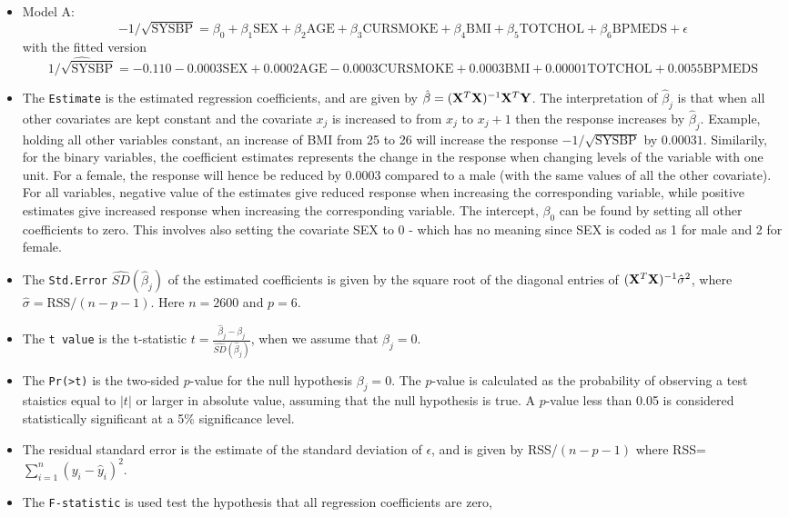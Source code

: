 \documentclass[]{article}
\begin{document}
\begin{itemize}
\item
  {Model A:
  \[-1/\sqrt{\text{SYSBP}}=\beta_0 + \beta_1 \text{SEX} + \beta_2 \text{AGE} + \beta_3 \text{CURSMOKE} + \beta_4 \text{BMI} + \beta_5 \text{TOTCHOL} + \beta_6 \text{BPMEDS} + \epsilon\]
  with the fitted version
  \[\widehat{1/\sqrt{\text{SYSBP}}}=-0.110 -0.0003 \text{SEX} +0.0002 \text{AGE} -0.0003 \text{CURSMOKE} + 0.0003 \text{BMI} + 0.00001 \text{TOTCHOL} + 0.0055 \text{BPMEDS}\]}
\item
  {The \texttt{Estimate} is the estimated regression coefficients, and
  are given by \(\hat{\beta}=({\bf X}^T{\bf X})^{-1}{\bf X}^T{\bf Y}\).
  The interpretation of \(\hat{\beta}_j\) is that when all other
  covariates are kept constant and the covariate \(x_j\) is increased to
  from \(x_j\) to \(x_j+1\) then the response increases by
  \(\hat{\beta}_j\). Example, holding all other variables constant, an
  increase of BMI from 25 to 26 will increase the response
  \(-1/\sqrt{\text{SYSBP}}\) by \(0.00031\). Similarily, for the binary
  variables, the coefficient estimates represents the change in the
  response when changing levels of the variable with one unit. For a
  female, the response will hence be reduced by \(0.0003\) compared to a
  male (with the same values of all the other covariate). For all
  variables, negative value of the estimates give reduced response when
  increasing the corresponding variable, while positive estimates give
  increased response when increasing the corresponding variable. The
  intercept, \(\beta_0\) can be found by setting all other coefficients
  to zero. This involves also setting the covariate SEX to 0 - which has
  no meaning since SEX is coded as 1 for male and 2 for female. }
\item
  {The \texttt{Std.Error} \(\hat{SD}(\hat\beta_j)\) of the estimated
  coefficients is given by the square root of the diagonal entries of
  \(({\bf X}^T{\bf X})^{-1}\hat{\sigma}^2\), where
  \(\hat{\sigma}=\text{RSS}/(n-p-1)\). Here \(n=2600\) and \(p=6\).}
\item
  {The \texttt{t\ value} is the t-statistic
  \(t = \frac{\hat\beta_j-\beta_j}{\hat{SD}(\hat\beta_j)}\), when we
  assume that \(\beta_j=0\).}
\item
  {The \texttt{Pr(\textgreater{}\textbar{}t\textbar{})} is the two-sided
  \(p\)-value for the null hypothesis \(\beta_j=0\). The \(p\)-value is
  calculated as the probability of observing a test staistics equal to
  \(|t|\) or larger in absolute value, assuming that the null hypothesis
  is true. A \(p\)-value less than 0.05 is considered statistically
  significant at a 5\% significance level. }
\item
  {The residual standard error is the estimate of the standard deviation
  of \(\epsilon\), and is given by RSS/\((n-p-1)\) where
  RSS=\(\sum_{i=1}^n (y_i-\hat{y}_i)^2\). }
\item
  The \texttt{F-statistic} is used test the hypothesis that all
  regression coefficients are zero,


\end{itemize}
\end{document}
